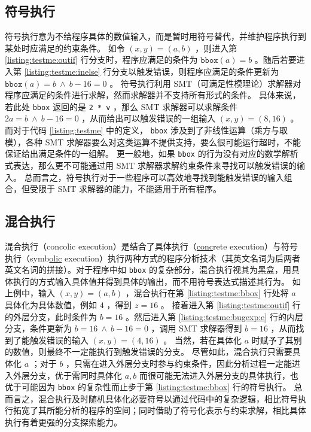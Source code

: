 \subsection{符号执行}

符号执行\cite{symbexe}意为不给程序具体的数值输入，而是暂时用符号替代，并维护程序执行到某处时应满足的约束条件。
如令 $(x, y) = (a, b)$ ，则进入第 \ref{listing:testme:outif} 行分支时，程序应满足的条件为 $\texttt{bbox}(a) = b$ 。随后若要进入第 \ref{listing:testme:inelse} 行分支以触发错误，则程序应满足的条件更新为 $\texttt{bbox}(a) = b ~\wedge~ b - 16 = 0$ 。
符号执行利用 SMT（可满足性模理论）求解器对程序应满足的条件进行求解，然而求解器并不支持所有形式的条件。
具体来说，若此处 \texttt{bbox} 返回的是 \texttt{2 * v} ，那么 SMT 求解器可以求解条件 $2a = b ~\wedge~ b - 16 = 0$ ，从而给出可以触发错误的一组输入 $(x, y) = (8, 16)$ 。
而对于代码 \ref{listing:testme} 中的定义， \texttt{bbox} 涉及到了非线性运算（乘方与取模），各种 SMT 求解器要么对这类运算不提供支持，要么很可能运行超时，不能保证给出满足条件的一组解。
更一般地，如果 \texttt{bbox} 的行为没有对应的数学解析式表达，那么更不可能通过用 SMT 求解器求解约束条件来寻找可以触发错误的输入。
总而言之，符号执行对于一些程序可以高效地寻找到能触发错误的输入组合，但受限于 SMT 求解器的能力，不能适用于所有程序。

\subsection{混合执行}

混合执行（concolic execution）\cite{dart, cute}是结合了具体执行（\underline{conc}rete execution）与符号执行（symb\underline{olic} execution）执行两种方式的程序分析技术（其英文名词为后两者英文名词的拼接）。对于程序中如 \texttt{bbox} 的复杂部分，混合执行视其为黑盒，用具体执行的方式输入具体值并得到具体的输出，而不用符号表达式描述其行为。
如上例中，输入 $(x, y) = (a, b)$ ，混合执行在第 \ref{listing:testme:bbox} 行处将 $a$ 具体化为具体数值，例如 $4$ ，得到 $z = 16$ 。
接着进入第 \ref{listing:testme:outif} 行的外层分支，此时条件为 $b = 16$ 。然后进入第 \ref{listing:testme:bugexp:e} 行的内层分支，条件更新为 $b = 16 ~\wedge~ b - 16 = 0$ ，调用 SMT 求解器得到 $b = 16$ ，从而找到了能触发错误的输入 $(x, y) = (4, 16)$ 。
当然，若在具体化 $a$ 时赋予了其别的数值，则最终不一定能执行到触发错误的分支。
尽管如此，混合执行只需要具体化 $a$ ；对于 $b$ ，只需在进入外层分支时参与约束条件，因此分析过程一定能进入外层分支，优于需同时具体化 $a, b$ 而很可能无法进入外层分支的具体执行，也优于可能因为 \texttt{bbox} 的复杂性而止步于第 \ref{listing:testme:bbox} 行的符号执行。
总而言之，混合执行及时随机具体化必要符号以通过代码中的复杂逻辑，相比符号执行拓宽了其所能分析的程序的空间；同时借助了符号化表示与约束求解，相比具体执行有着更强的分支探索能力。

